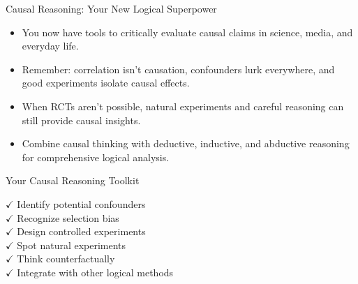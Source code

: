 \documentclass{beamer}
\begin{document}
	\begin{frame}{Causal Reasoning: Your New Logical Superpower}
		\begin{itemize}
			\item You now have tools to critically evaluate causal claims in science, media, and everyday life.
			\item Remember: correlation isn't causation, confounders lurk everywhere, and good experiments isolate causal effects.
			\item When RCTs aren't possible, natural experiments and careful reasoning can still provide causal insights.
			\item Combine causal thinking with deductive, inductive, and abductive reasoning for comprehensive logical analysis.
		\end{itemize}
		
		\begin{block}{Your Causal Reasoning Toolkit}
			\begin{center}
				$\checkmark$ Identify potential confounders\\
				$\checkmark$ Recognize selection bias\\
				$\checkmark$ Design controlled experiments\\
				$\checkmark$ Spot natural experiments\\
				$\checkmark$ Think counterfactually\\
				$\checkmark$ Integrate with other logical methods
			\end{center}
		\end{block}
	\end{frame}
	
\end{document}
